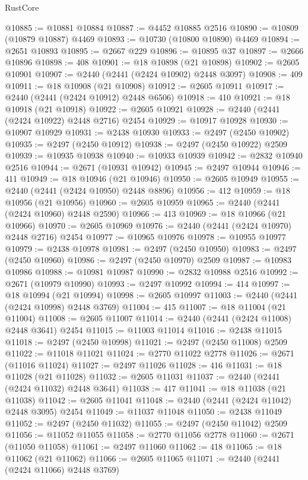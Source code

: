 \begin{lexlean}{RustCore}
\begin{coremodule}
@10885 := @10881 @10884
@10887 := @4452 @10885 @2516
@10890 := @10809 (@10879 @10887) @4469
@10893 := @10730 (@10800 @10890) @4469
@10894 := @2651 @10893
@10895 := @2667 @229
@10896 := @10895 @37
@10897 := @2666 @10896
@10898 := 408
@10901 := @18 @10898 (@21 @10898)
@10902 := @2605 @10901
@10907 := @2440 (@2441 (@2424 @10902) @2448 @3097)
@10908 := 409
@10911 := @18 @10908 (@21 @10908)
@10912 := @2605 @10911
@10917 := @2440 (@2441 (@2424 @10912) @2448 @6506)
@10918 := 410
@10921 := @18 @10918 (@21 @10918)
@10922 := @2605 @10921
@10928 := @2440 (@2441 (@2424 @10922) @2448 @2716) @2454
@10929 := @10917 @10928
@10930 := @10907 @10929
@10931 := @2438 @10930
@10933 := @2497 (@2450 @10902)
@10935 := @2497 (@2450 @10912)
@10938 := @2497 (@2450 @10922) @2509
@10939 := @10935 @10938
@10940 := @10933 @10939
@10942 := @2832 @10940 @2516
@10944 := @2671 (@10931 @10942)
@10945 := @2497 @10944
@10946 := 411
@10949 := @18 @10946 (@21 @10946)
@10950 := @2605 @10949
@10955 := @2440 (@2441 (@2424 @10950) @2448 @8896)
@10956 := 412
@10959 := @18 @10956 (@21 @10956)
@10960 := @2605 @10959
@10965 := @2440 (@2441 (@2424 @10960) @2448 @2590)
@10966 := 413
@10969 := @18 @10966 (@21 @10966)
@10970 := @2605 @10969
@10976 := @2440 (@2441 (@2424 @10970) @2448 @2716) @2454
@10977 := @10965 @10976
@10978 := @10955 @10977
@10979 := @2438 @10978
@10981 := @2497 (@2450 @10950)
@10983 := @2497 (@2450 @10960)
@10986 := @2497 (@2450 @10970) @2509
@10987 := @10983 @10986
@10988 := @10981 @10987
@10990 := @2832 @10988 @2516
@10992 := @2671 (@10979 @10990)
@10993 := @2497 @10992
@10994 := 414
@10997 := @18 @10994 (@21 @10994)
@10998 := @2605 @10997
@11003 := @2440 (@2441 (@2424 @10998) @2448 @3769)
@11004 := 415
@11007 := @18 @11004 (@21 @11004)
@11008 := @2605 @11007
@11014 := @2440 (@2441 (@2424 @11008) @2448 @3641) @2454
@11015 := @11003 @11014
@11016 := @2438 @11015
@11018 := @2497 (@2450 @10998)
@11021 := @2497 (@2450 @11008) @2509
@11022 := @11018 @11021
@11024 := @2770 @11022 @2778
@11026 := @2671 (@11016 @11024)
@11027 := @2497 @11026
@11028 := 416
@11031 := @18 @11028 (@21 @11028)
@11032 := @2605 @11031
@11037 := @2440 (@2441 (@2424 @11032) @2448 @3641)
@11038 := 417
@11041 := @18 @11038 (@21 @11038)
@11042 := @2605 @11041
@11048 := @2440 (@2441 (@2424 @11042) @2448 @3095) @2454
@11049 := @11037 @11048
@11050 := @2438 @11049
@11052 := @2497 (@2450 @11032)
@11055 := @2497 (@2450 @11042) @2509
@11056 := @11052 @11055
@11058 := @2770 @11056 @2778
@11060 := @2671 (@11050 @11058)
@11061 := @2497 @11060
@11062 := 418
@11065 := @18 @11062 (@21 @11062)
@11066 := @2605 @11065
@11071 := @2440 (@2441 (@2424 @11066) @2448 @3769)

\end{coremodule}
\end{lexlean}
